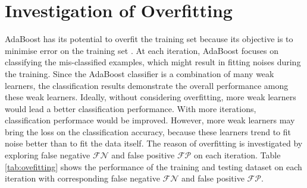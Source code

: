 \chapter{Investigation of Overfitting}
\label{apx:overfitting}
AdaBoost has its potential to overfit the training set because its objective is to minimise error on the training set \cite{Bylander2006}. At each iteration, AdaBoost focuses on classifying the mis-classified examples, which might result in fitting noises during the training. Since the AdaBoost classifier is a combination of many weak learners, the classification results demonstrate the overall performance among these weak learners. Ideally, without considering overfitting, more weak learners would lead a better classification performance. With more iterations, classification performace would be improved. However, more weak learners may bring the loss on the classification accuracy, because these learners trend to fit noise better than to fit the data itself. The reason of overfitting is investigated by exploring false negative $\mathcal{FN}$ and false positive $\mathcal{FP}$ on each iteration. \mbox{Table} \ref{tab:ovefitting} shows the performance of the training and testing dataset on each iteration with corresponding false negative $\mathcal{FN}$ and false positive $\mathcal{FP}$.
